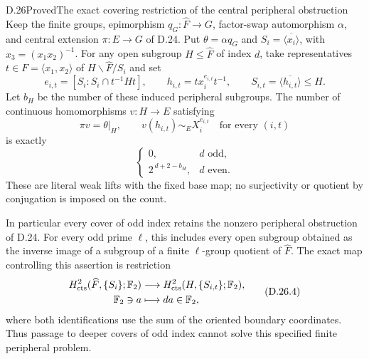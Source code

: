 \begin{statement}{D.26}{Proved}{The exact covering restriction of the central peripheral obstruction}
Keep the finite groups, epimorphism $q_G:\widehat F\to G$,
factor-swap automorphism $\alpha$, and central extension
$\pi:E\to G$ of D.24.  Put $\theta=\alpha q_G$ and
$S_i=\overline{\langle x_i\rangle}$, with
$x_3=(x_1x_2)^{-1}$.  For any open subgroup
$H\leq\widehat F$ of index $d$, take representatives
$t\in F=\langle x_1,x_2\rangle$ of
$H\backslash\widehat F/S_i$ and set
\[
 e_{i,t}=[S_i:S_i\cap t^{-1}Ht],\qquad
 h_{i,t}=t x_i^{e_{i,t}}t^{-1},\qquad
 S_{i,t}=\overline{\langle h_{i,t}\rangle}\leq H.
 \tag{D.26.1}
\]
Let $b_H$ be the number of these induced peripheral subgroups.
The number of continuous homomorphisms $v:H\to E$ satisfying
\[
       \pi v=\theta|_H,\qquad
       v(h_{i,t})\sim_E X_i^{e_{i,t}}
                  \quad\text{for every }(i,t)
 \tag{D.26.2}
\]
is exactly
\[
 \begin{cases}
  0,&d\text{ odd},\\
  2^{\,d+2-b_H},&d\text{ even}.
 \end{cases}
 \tag{D.26.3}
\]
These are literal weak lifts with the fixed base map; no
surjectivity or quotient by conjugation is imposed on the count.

In particular every cover of odd index retains the nonzero
peripheral obstruction of D.24.  For every odd prime $\ell$,
this includes every open subgroup obtained as the inverse image
of a subgroup of a finite $\ell$-group quotient of $\widehat F$.
The exact map controlling this assertion is restriction
\[
\begin{split}
 H^2_{\mathrm{cts}}(\widehat F,\{S_i\};\mathbb F_2)&\longrightarrow
           H^2_{\mathrm{cts}}(H,\{S_{i,t}\};\mathbb F_2),\\
                   \mathbb F_2\ni a&\longmapsto d a\in\mathbb F_2,
\end{split}
 \tag{D.26.4}
\]
where both identifications use the sum of the oriented boundary
coordinates.  Thus passage to deeper covers of odd index cannot
solve this specified finite peripheral problem.
\end{statement}
